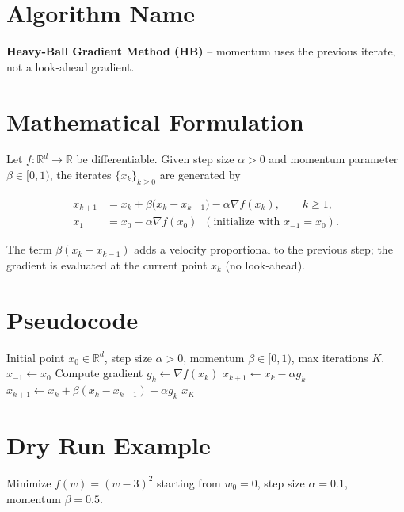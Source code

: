 \documentclass{article}
\begin{document}
\section*{Algorithm Name}
\textbf{Heavy‑Ball Gradient Method (HB)} – momentum uses the previous iterate, not a look‑ahead gradient.

\section*{Mathematical Formulation}
Let $f:\mathbb{R}^d\rightarrow\mathbb{R}$ be differentiable.  
Given step size $\alpha>0$ and momentum parameter $\beta\in[0,1)$, the iterates $\{x_k\}_{k\ge 0}$ are generated by  

\[
\boxed{
\begin{aligned}
x_{k+1}&=x_k+\beta\bigl(x_k-x_{k-1}\bigr)-\alpha\nabla f(x_k),\qquad k\ge 1,\\[2mm]
x_1    &=x_0-\alpha\nabla f(x_0) \;\;(\text{initialize with }x_{-1}=x_0).
\end{aligned}}
\]

The term $\beta(x_k-x_{k-1})$ adds a velocity proportional to the previous step; the gradient is evaluated at the current point $x_k$ (no look‑ahead).

\section*{Pseudocode}
\begin{algorithm}[H]
\caption{Heavy‑Ball Gradient Method}
\begin{algorithmic}[1]
\REQUIRE Initial point $x_0\in\mathbb{R}^d$, step size $\alpha>0$, momentum $\beta\in[0,1)$, max iterations $K$.
\STATE $x_{-1}\leftarrow x_0$ 
    \STATE Compute gradient $g_k\leftarrow \nabla f(x_k)$
        \STATE $x_{k+1}\leftarrow x_k-\alpha g_k$  
    \ELSE
        \STATE $x_{k+1}\leftarrow x_k+\beta (x_k-x_{k-1})-\alpha g_k$
    \ENDIF
\ENDFOR
\RETURN $x_K$
\end{algorithmic}
\end{algorithm}

\section*{Dry Run Example}
Minimize $f(w)=(w-3)^2$ starting from $w_0=0$, step size $\alpha=0.1$, momentum $\beta=0.5$.
\end{document}
